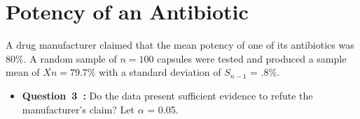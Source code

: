 \vspace{1cm}
\section{Potency of an Antibiotic}
\vspace{.2cm}

\noindent
A drug manufacturer claimed that the mean potency of one of its antibiotics was $80\%$. A random sample
of $n=100$ capsules were tested and produced a sample mean of  $\overline{Xn}=79.7\%$ with a standard deviation
of $S_{n-1}$ = $.8\%$.

\vspace{.2cm}


\begin{itemize}[label={},itemindent=-2em,leftmargin=2em]
    \item \textbf{Question~3~:} Do the data present sufficient evidence to refute the manufacturer’s claim? Let $\alpha$ = 0.05.
\end{itemize}
\vspace{.2cm}

